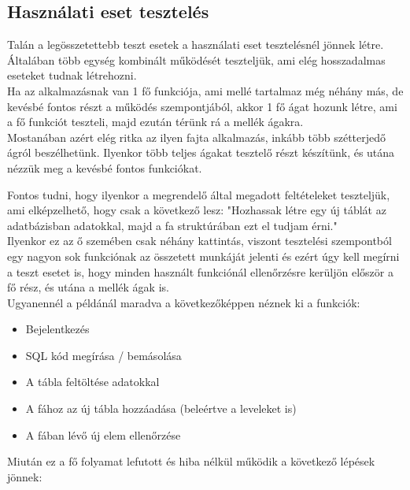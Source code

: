 \subsection{Használati eset tesztelés} Talán a legösszetettebb teszt esetek a használati eset tesztelésnél jönnek létre. Általában több egység kombinált működését teszteljük, ami elég hosszadalmas eseteket tudnak létrehozni. \\

Ha az alkalmazásnak van 1 fő funkciója, ami mellé tartalmaz még néhány más, de kevésbé fontos részt a működés szempontjából, akkor 1 fő ágat hozunk létre, ami a fő funkciót teszteli, majd ezután térünk rá a mellék ágakra. \\

Mostanában azért elég ritka az ilyen fajta alkalmazás, inkább több szétterjedő ágról beszélhetünk. Ilyenkor több teljes ágakat tesztelő részt készítünk, és utána nézzük meg a kevésbé fontos funkciókat.

Fontos tudni, hogy ilyenkor a megrendelő által megadott feltételeket teszteljük, ami elképzelhető, hogy csak a következő lesz: "Hozhassak létre egy új táblát az adatbázisban adatokkal, majd a fa struktúrában ezt el tudjam érni." \\

Ilyenkor ez az ő szemében csak néhány kattintás, viszont tesztelési szempontból egy nagyon sok funkciónak az összetett munkáját jelenti és ezért úgy kell megírni a teszt esetet is, hogy minden használt funkciónál ellenőrzésre kerüljön először a fő rész, és utána a mellék ágak is.\\

Ugyanennél a példánál maradva a következőképpen néznek ki a funkciók:
\begin{itemize}
	\item Bejelentkezés
	\item SQL kód megírása / bemásolása
	\item A tábla feltöltése adatokkal
	\item A fához az új tábla hozzáadása (beleértve a leveleket is)
	\item A fában lévő új elem ellenőrzése
\end{itemize}

Miután ez a fő folyamat lefutott és hiba nélkül működik a következő lépések jönnek:

